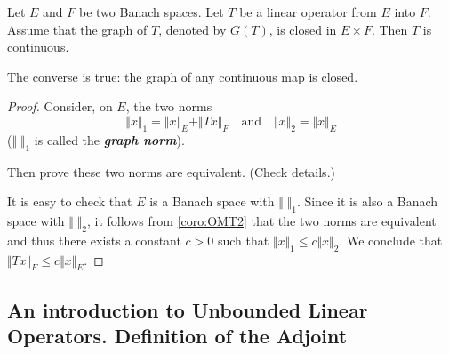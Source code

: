 \documentclass{article}
\theoremstyle{definition}
\numberwithin{equation}{section}
\begin{document}
\begin{thm}
	Let $E$ and $F$ be two Banach spaces. Let $T$ be a linear operator from $E$ into $F$. Assume that the graph of $T$, denoted by $G(T)$, is closed in $E\times F$. Then $T$ is continuous.
\end{thm}
\begin{remark}
	The converse is true: the graph of any continuous map is closed.
\end{remark}
\begin{proof}
	Consider, on $E$, the two norms
	\[\Vert x\Vert_1=\Vert x\Vert_E+\Vert Tx\Vert_F\quad\text{and}\quad\Vert x\Vert_2=\Vert x\Vert_E\]
	($\Vert\;\Vert_1$ is called the \textbf{\textit{graph norm}}).
	
	{\color{orange}Then prove these two norms are equivalent. (Check details.)}
	
	It is easy to check that $E$ is a Banach space with $\Vert\;\Vert_1$. Since it is also a Banach space with $\Vert\;\Vert_2$, it follows from \cref{coro:OMT2} that the two norms are equivalent and thus there exists a constant $c>0$ such that $\Vert x\Vert_1\leq c\Vert x\Vert_2$. We conclude that $\Vert Tx\Vert_F\leq c\Vert x\Vert_E$. 
\end{proof}

	\subsection{An introduction to Unbounded Linear Operators. Definition of the Adjoint}
\end{document}
